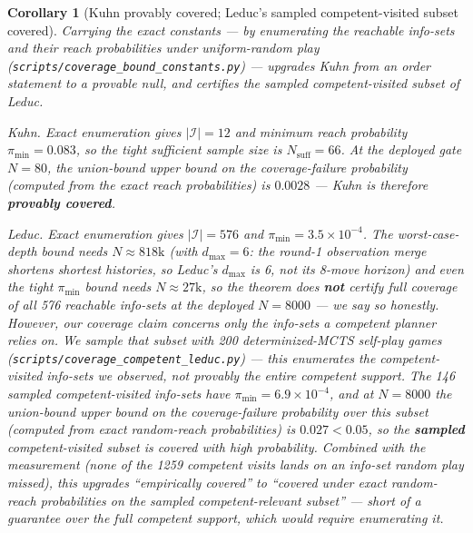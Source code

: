 \documentclass[11pt]{article}
\newtheorem{corollary}{Corollary}
\theoremstyle{remark}
\newcommand{\Ireach}{\mathcal{I}}
\begin{document}
\begin{corollary}[Kuhn provably covered; Leduc's sampled competent-visited subset covered]
Carrying the exact constants --- by enumerating the reachable info-sets and their reach probabilities under uniform-random play (\texttt{scripts/coverage\_bound\_constants.py}) --- upgrades Kuhn from an order statement to a provable null, and certifies the \emph{sampled} competent-visited subset of Leduc.

\emph{Kuhn.} Exact enumeration gives $|\Ireach| = 12$ and minimum reach probability $\pi_{\min} = 0.083$, so the tight sufficient sample size is $N_{\text{suff}} = 66$. At the deployed gate $N = 80$, the union-bound upper bound on the coverage-failure probability (computed from the exact reach probabilities) is $0.0028$ --- Kuhn is therefore \textbf{provably covered}.

\emph{Leduc.} Exact enumeration gives $|\Ireach| = 576$ and $\pi_{\min} = 3.5 \times 10^{-4}$. The worst-case-depth bound needs $N \approx 818\text{k}$ (with $d_{\max} = 6$: the round-1 observation merge shortens shortest histories, so Leduc's $d_{\max}$ is 6, not its 8-move horizon) and even the tight $\pi_{\min}$ bound needs $N \approx 27\text{k}$, so the theorem does \textbf{not} certify full coverage of all 576 reachable info-sets at the deployed $N = 8000$ --- we say so honestly. However, our coverage claim concerns \emph{only} the info-sets a competent planner relies on. We \emph{sample} that subset with 200 determinized-MCTS self-play games (\texttt{scripts/coverage\_competent\_leduc.py}) --- this enumerates the competent-visited info-sets we observed, not provably the entire competent support. The 146 sampled competent-visited info-sets have $\pi_{\min} = 6.9 \times 10^{-4}$, and at $N = 8000$ the union-bound upper bound on the coverage-failure probability over this subset (computed from exact random-reach probabilities) is $0.027 < 0.05$, so the \textbf{sampled} competent-visited subset is covered with high probability. Combined with the measurement (none of the 1259 competent visits lands on an info-set random play missed), this upgrades ``empirically covered'' to ``covered under exact random-reach probabilities on the sampled competent-relevant subset'' --- short of a guarantee over the full competent support, which would require enumerating it.


\end{corollary}
\end{document}

